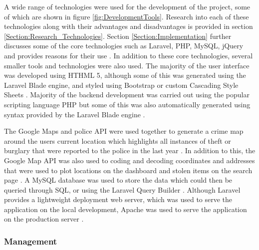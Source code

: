 A wide range of technologies were used for the development of the project, some of which are shown in figure \ref{fig:DevelopmentTools}. Research into each of these technologies along with their advantages and disadvantages is provided in section \ref{Section:Research_Technologies}. Section \ref{Section:Implementation} further discusses some of the core technologies such as Laravel, PHP, MySQL, jQuery and provides reasons for their use \cite{Laravel:Home, PHP:Home, MySQL:Home, jQuery:Home}. In addition to these core technologies, several smaller tools and technologies were also used. The majority of the user interface was developed using HTHML 5, although some of this was generated using the Laravel Blade engine, and styled using Bootstrap or custom Cascading Style Sheets \cite{W3:HTML5, Bootstrap:Home, W3:CSS}. Majority of the backend development was carried out using the popular scripting language PHP but some of this was also automatically generated using syntax provided by the Laravel Blade engine \cite{PHP:Home, Laravel:Blade}. 


The Google Maps and police API were used together to generate a crime map around the users current location which highlights all instances of theft or burglary that were reported to the police in the last year \cite{Google:Maps, Police:API}. In addition to this, the Google Map API was also used to coding and decoding coordinates and addresses that were used to plot locations on the dashboard and stolen items on the search page \cite{Google:GeoCoding}. A MySQL database was used to store the data which could then be queried through SQL, or using the Laravel Query Builder \cite{MySQL:Home, Laravel:QueryBuilder}. Although Laravel provides a lightweight deployment web server, which was used to serve the application on the local development, Apache was used to serve the application on the production server \cite{Laravel:Home, Apache:Home}.


\subsubsection{Management}

